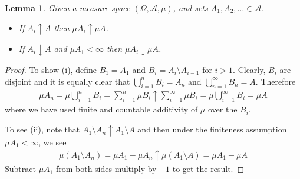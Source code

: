 \documentclass{amsart}
\newtheorem{lem}[thm]{Lemma}
\theoremstyle{remark}
\theoremstyle{definition}
\begin{document}
\begin{lem}\label{ContinuityOfMeasure}Given a measure space $(\Omega, \mathcal{A}, \mu)$, and sets $A_1, A_2, \dots \in \mathcal{A}$.
\begin{itemize}
\item[(i)] If $A_i \uparrow A$ then $\mu A_i \uparrow \mu A$.
\item[(ii)] If $A_i \downarrow A$ and $\mu A_1 < \infty$ then $\mu A_i \downarrow \mu A$.
\end{itemize}
\end{lem}
\begin{proof}To show (i), define $B_1 = A_1$ and $B_i = A_i \setminus
  A_{i-1}$ for $i > 1$.  Clearly, $B_i$ are disjoint and it is equally
  clear that $\bigcup_{i=1}^n B_i = A_n$ and $\bigcup_{n=1} ^\infty
  B_n = A$.
Therefore
\begin{align*}
\mu A_n = \mu \bigcup_{i=1}^n B_i = \sum_{i=1}^n \mu B_i \uparrow
\sum_{i=1}^\infty \mu B_i = \mu \bigcup_{i=1}^\infty  B_i = \mu A
\end{align*}
where we have used finite and countable additivity of $\mu$ over the
$B_i$.

To see (ii), note that $A_1 \setminus A_n \uparrow A_1
\setminus A$ and then under the finiteness assumption $\mu A_1 <
\infty$, we see 
\begin{align*}
\mu (A_1 \setminus A_n) = \mu A_1 - \mu A_n \uparrow
\mu (A_1 \setminus A) = \mu A_1 - \mu A
\end{align*}
Subtract $\mu A_1$ from both sides multiply by $-1$ to get the result.
\end{proof}
\end{document}
